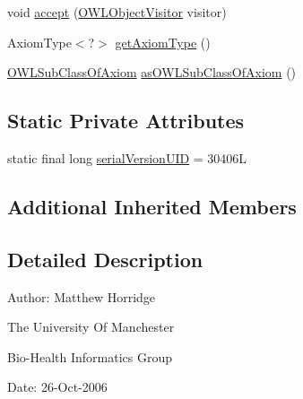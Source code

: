 \begin{DoxyCompactItemize}
\item 
void \hyperlink{classuk_1_1ac_1_1manchester_1_1cs_1_1owl_1_1owlapi_1_1_o_w_l_inverse_functional_object_property_axiom_impl_a9adec7361360fe79fd79dcce4e2e7051}{accept} (\hyperlink{interfaceorg_1_1semanticweb_1_1owlapi_1_1model_1_1_o_w_l_object_visitor}{O\-W\-L\-Object\-Visitor} visitor)
\item 
Axiom\-Type$<$?$>$ \hyperlink{classuk_1_1ac_1_1manchester_1_1cs_1_1owl_1_1owlapi_1_1_o_w_l_inverse_functional_object_property_axiom_impl_a3c12d142fb66fca0321b60a9d93254ed}{get\-Axiom\-Type} ()
\item 
\hyperlink{interfaceorg_1_1semanticweb_1_1owlapi_1_1model_1_1_o_w_l_sub_class_of_axiom}{O\-W\-L\-Sub\-Class\-Of\-Axiom} \hyperlink{classuk_1_1ac_1_1manchester_1_1cs_1_1owl_1_1owlapi_1_1_o_w_l_inverse_functional_object_property_axiom_impl_a74215ff354fb2ea2f7714b3b06a3f137}{as\-O\-W\-L\-Sub\-Class\-Of\-Axiom} ()
\end{DoxyCompactItemize}
\subsection*{Static Private Attributes}
\begin{DoxyCompactItemize}
\item 
static final long \hyperlink{classuk_1_1ac_1_1manchester_1_1cs_1_1owl_1_1owlapi_1_1_o_w_l_inverse_functional_object_property_axiom_impl_a843852c8626880d12874da5193b771c5}{serial\-Version\-U\-I\-D} = 30406\-L
\end{DoxyCompactItemize}
\subsection*{Additional Inherited Members}


\subsection{Detailed Description}
Author\-: Matthew Horridge\par
 The University Of Manchester\par
 Bio-\/\-Health Informatics Group\par
 Date\-: 26-\/\-Oct-\/2006\par
\par
 

